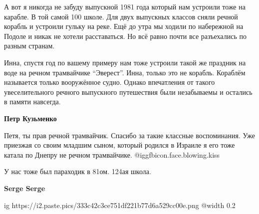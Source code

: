 \begin{itemize}

А вот я никогда не забуду выпускной 1981 года который нам устроили тоже на
карабле. В той самой 100 школе. Для двух выпускных классов сняли речной корабль
и устроили гульку на реке. Ещё до утра мы ходили по набережной на Подоле и
никак не хотели расставаться. Но всё равно почти все разъехались по разным
странам.

\begin{itemize} %

Инна, спустя год по вашему примеру нам тоже устроили такой же праздник на воде
на речном трамвайчике \enquote{Эверест}. Инна, только это не корабль. Кораблём
называется только вооружённое судно. Однако впечатления от такого
увеселительного речного выпускного путешествия были незабываемы и остались в
памяти навсегда.

\textbf{Петр Кузьменко} 

Петя, ты прав речной трамвайчик. Спасибо за такие классные воспоминания. Уже
приезжая со своим младшим сыном, который родился в Израиле я его тоже катала по
Днепру не речном трамвайчике. @igg{fbicon.face.blowing.kiss} 


У нас тоже был параходик в 81ом.
124ая школа.

\textbf{Serge Serge}

\ifcmt
  ig https://i2.paste.pics/333c42c3ce751df221b77d6a529cc00e.png
  @width 0.2
\fi

\end{itemize} %

\end{itemize} %
